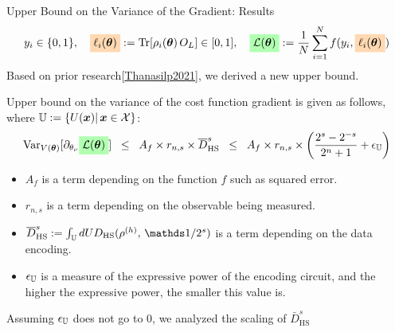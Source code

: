 \documentclass[dvipdfmx,10pt,aspectratio=169]{beamer}
\begin{document}
\begin{frame}{Upper Bound on the Variance of the Gradient: Results}
    \vspace*{-15pt}
    $$y_i \in \{0,1\},\quad \colorbox{orange!30}{$\ell_i(\bth)$} := \Tr[\rho_i(\bth)\,O_L] \in [0,1],\quad
    \colorbox{green!30}{$\calL(\bth)$} := \frac1N\sum_{i=1}^N f(y_i, \colorbox{orange!30}{$\ell_i(\bth)$})$$
    \vspace*{-5pt}
    Based on prior research{\small[\href{https://arxiv.org/abs/2110.14753v1}{Thanasilp2021}]}, we derived a new upper bound.

    \begin{theorem}
        Upper bound on the variance of the cost function gradient is given as follows, where $\mathbb{U} := \{U(\vb*{x})|\,\vb*{x}\in \mathcal{X}\}$:
        \vspace*{-10pt}
        \begin{align*}
            \Var_{V(\bth)}[\pd_{\theta_\nu} \colorbox{green!30}{$\calL(\bth)$}] \;\;
            \leq\;\;
            A_f \times r_{n,s} \times \bar{D}_{\mathrm{HS}}^s \;\;
            \leq\;\;
            A_f \times r_{n,s} \times \qty(\frac{2^s-2^{-s}}{2^n+1} + \epsilon_{\bbU})
        \end{align*}
    \end{theorem}

    \begin{itemize}
        \item $A_f$ is a term depending on the function $f$ such as squared error.
        \item $r_{n,s}$ is a term depending on the observable being measured.
        \item $\bar{D}_{\mathrm{HS}}^s := \int_{\bbU}dU D_{\mathrm{HS}} ( \rho^{(h)} ,\, \bbid/2^s )$ is a term depending on the data encoding.
        \item $\epsilon_{\mathbb{U}}$ is a measure of the expressive power of the encoding circuit, and the higher the expressive power, the smaller this value is.
    \end{itemize}

    Assuming $\epsilon_{\mathbb{U}}$ does not go to $0$,
    we analyzed the scaling of $\bar{D}_{\mathrm{HS}}^s$
\end{frame}
\end{document}
